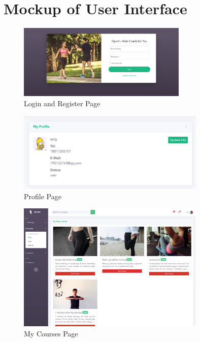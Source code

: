 \documentclass[16pt]{scrreprt}
\begin{document}
\section{Mockup of User Interface}
\begin{figure}[H]
    \centering
    \includegraphics[width=0.72\textwidth]{diagrams/login_register.png}
    \caption{Login and Register Page}
\end{figure}

\begin{figure}[H]
    \centering
    \includegraphics[width=0.8\textwidth]{diagrams/profile.png}
    \caption{Profile Page}
\end{figure}

\begin{figure}[H]
    \centering
    \includegraphics[width=0.8\textwidth]{diagrams/mine.png}
    \caption{My Courses Page}
\end{figure}
\end{document}
